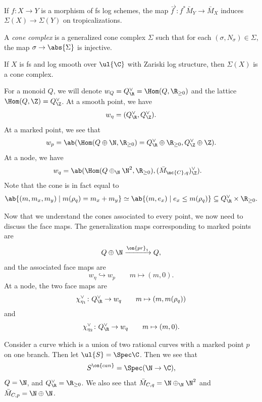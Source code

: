 \begin{exm}
    If \(f \colon X \to Y\) is a morphism of fs log schemes, the map \(\bar{f}^{\flat} \colon f^* \bar{M}_Y \to \bar{M}_X\) induces \(\Sigma(X) \to \Sigma(Y)\) on tropicalizations.
\end{exm}

\begin{defn}
    A \textit{cone complex} is a generalized cone complex \(\Sigma\) such that for each \((\sigma, N_{\sigma}) \in \Sigma\), the map \(\sigma \to \abs{\Sigma}\) is injective.
\end{defn}

\begin{thm}
    If \(X\) is fs and log smooth over \(\ul{\C}\) with Zariski log structure, then \(\Sigma(X)\) is a cone complex.
\end{thm}

For a monoid \(Q\), we will denote \(w_Q = Q_{\R}^{\vee} = \Hom(Q, \R_{\geq 0})\) and the lattice \(\Hom(Q, \Z) = Q_{\Z}^{\vee}\). At a smooth point, we have
\[ w_{\eta} = (Q_{\R}^{\vee}, Q_{\Z}^{\vee}). \]
At a marked point, we see that
\[ w_p = \ab(\Hom (Q \oplus \N, \R_{\geq 0}) = Q_{\R}^{\vee} \oplus \R_{\geq 0}, Q_{\Z}^{\vee}\oplus \Z). \]
At a node, we have
\begin{align*}
    w_q &= \ab(\Hom(Q \oplus_{\N} \N^2, \R_{\geq 0}), ( \bar{M}_{\mc{C}, q} )_{\Z}^{\vee}).
\end{align*}
Note that the cone is in fact equal to
\[ \ab\{(m, m_x, m_y) \mid m(\rho_q) = m_x + m_y \} \simeq \ab\{(m, e_x) \mid e_x \leq m(\rho_q) \} \subseteq Q_{\R}^{\vee} \times \R_{\geq 0}. \]

Now that we understand the cones associated to every point, we now need to discuss the face maps. The generalization maps corresponding to marked points are
\[ Q \oplus \N \xrightarrow{\on{pr}_1} Q, \]
and the associated face maps are 
\[ w_{\eta} \hookrightarrow w_p \qquad m \mapsto (m,0). \]
At a node, the two face maps are
\[ \chi_{\eta_1}^{\vee} \colon Q_{\R}^{\vee} \to w_q \qquad m \mapsto (m, m(\rho_q)) \]
and 
\[ \chi_{\eta_2}^{\vee} \colon Q_{\R}^{\vee} \to w_q \qquad m \mapsto (m, 0). \]

\begin{exm}
    Consider a curve which is a union of two rational curves with a marked point \(p\) on one branch. Then let \(\ul{S} = \Spec \C\). Then we see that
    \[ S^{\on{can}} = \Spec(\N \to \C), \]
    \(Q = \N\), and \(Q_{\R}^{\vee} = \R_{\geq 0}\). We also see that \(\bar{M}_{C, q} = \N \oplus_{\N} \N^2\) and \(\bar{M}_{C, p} = \N \oplus \N\).
\end{exm}

